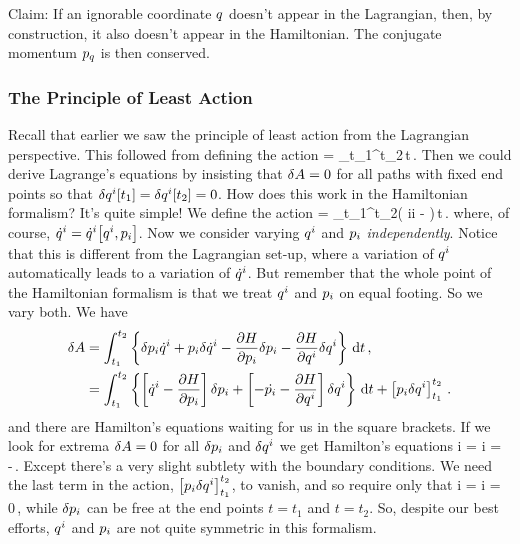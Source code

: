 Claim: If an ignorable coordinate $q$ doesn't appear in the Lagrangian, then, by construction, it also doesn't appear in the Hamiltonian. The conjugate momentum ${p}_{q}$ is then conserved.


\subsubsection{The Principle of Least Action}
Recall that earlier we saw the principle of least action from the Lagrangian perspective. This followed from defining the action
\beq
\action = \int_{t_1}^{t_2}\lag{}\,\dx t\,.
\eeq
Then we could derive Lagrange's equations by insisting that $\delta A = 0$ for all paths with fixed end points so that $\delta{q}^{i}\!\left[{t_1}\right] = \delta{q}^{i}\!\left[{t_2}\right] = 0$. How does this work in the Hamiltonian formalism? It's quite simple! We define the action
\beq
\action = \int_{t_1}^{t_2}\left( \gmom i\gvel i - \ham \right)\,\dx t\,.
\eeq
where, of course, ${\dot{q}}^{i} = {\dot{q}}^{i}\!\left[{{q}^{i}, {p}_{i}}\right]$. Now we consider varying ${q}^{i}$ and ${p}_{i}$ \emph{independently}. Notice that this is different from the Lagrangian set-up, where a variation of ${q}^{i}$ automatically leads to a variation of ${\dot{q}}^{i}$. But remember that the whole point of the Hamiltonian formalism is that we treat ${q}^{i}$ and ${p}_{i}$ on equal footing. So we vary both. We have
\begin{align*}
\delta A &= \int_{t_1}^{t_2}
                    \left\lbrace 
                        \delta{p}_{i}{\dot{q}}^{i} 
                        + {p}_{i} \delta{\dot{q}}^{i}
                        - \dfrac{\partial{H}}{\partial{{p}_{i}}}\delta{p}_{i}
                        - \dfrac{\partial{H}}{\partial{{q}^{i}}}\delta{q}^{i}
                    \right\rbrace \,\text{d} t\,,\\
              &= \int_{t_1}^{t_2}
                    \left\lbrace 
                        \left[ {\dot{q}}^{i} - \dfrac{\partial{H}}{\partial{{p}_{i}}}\right] \delta{p}_{i}
                        + \left[ -\dot{{p}_{i}} - \dfrac{\partial{H}}{\partial{{q}^{i}}}\right] \delta{q}^{i}
                    \right\rbrace \,\text{d} t
                  + \left[{p}_{i}\delta{q}^{i} \right]_{t_1}^{t_2} \,.
\end{align*}
and there are Hamilton's equations waiting for us in the square brackets. If we look for extrema $\delta A = 0$ for all $\delta{p}_{i}$ and $\delta{q}^{i}$ we get Hamilton's equations
\beq
\gvel i = \qquad{}\qquad \gpos i = -\,.
\eeq
Except there's a very slight subtlety with the boundary conditions. We need the last term in the action, $\left[{p}_{i}\delta{q}^{i} \right]_{t_1}^{t_2}$, to vanish, and so require only that
\beq
\delta\gpos i = \delta\gpos i = 0\,,
\eeq
while $\delta{p}_{i}$ can be free at the end points $t = t_1$ and $t = t_2$. So, despite our best efforts, ${q}^{i}$ and ${p}_{i}$ are not quite symmetric in this formalism.

